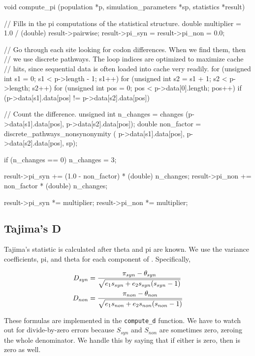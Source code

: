 \documentclass{article}
\begin{document}
\begin{ccode}
void compute_pi (population *p, simulation_parameters *sp, statistics *result) {
  // Fills in the pi computations of the statistical structure.
  double multiplier = 1.0 / (double) result->pairwise;
  result->pi_syn = result->pi_non = 0.0;

  // Go through each site looking for codon differences. When we   find them, then
  // we use discrete pathways. The loop indices are optimized to   maximize cache
  // hits, since sequential data is often loaded into cache very   readily.
  for (unsigned int s1 = 0; s1 < p->length - 1; s1++)
    for (unsigned int s2 = s1 + 1; s2 < p->length; s2++)
      for (unsigned int pos = 0; pos < p->data[0].length; pos++)
	if (p->data[s1].data[pos] != p->data[s2].data[pos]) {
	  // Count the difference.
	  unsigned int	n_changes  = changes (p->data[s1].data[pos],  p->data[s2].data[pos]);
	  double	non_factor = discrete_pathways_nonsynonymity (
	    p->data[s1].data[pos], p->data[s2].data[pos], sp);

	  if (n_changes == 0) n_changes = 3;

	  result->pi_syn += (1.0 - non_factor) * (double) n_changes;
	  result->pi_non += non_factor * (double) n_changes;
	}

  result->pi_syn *= multiplier;
  result->pi_non *= multiplier;
}
\end{ccode}

    \subsection{Tajima's D}
      \label{sec:d-statistic}

      Tajima's \D{} statistic is calculated after theta and pi are known. We use
      the variance coefficients, pi, and theta for each component of \D{}.
      Specifically,

      \begin{align*}
	D_{syn} & = {\pi_{syn} - \theta_{syn} \over
		     \sqrt{e_1 s_{syn} + e_2 s_{syn} (s_{syn} - 1)}} \\ %
	D_{non} & = {\pi_{non} - \theta_{non} \over
		     \sqrt{e_1 s_{non} + e_2 s_{non} (s_{non} - 1)}}
      \end{align*}

      These formulas are implemented in the \verb|compute_d| function. We have
      to watch out for divide-by-zero errors because $S_{syn}$ and $S_{non}$ are
      sometimes zero, zeroing the whole denominator. We handle this by saying
      that if either is zero, then \D{} is zero as well.
\end{document}
